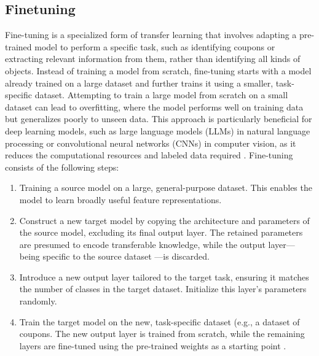 \documentclass[licencjacka,en]{pracamgr}
\begin{document}
\subsection{Finetuning}
Fine-tuning is a specialized form of transfer learning that involves adapting a pre-trained model to perform a specific task, such as identifying coupons or extracting relevant information from them, rather than identifying all kinds of objects. Instead of training a model from scratch, fine-tuning starts with a model already trained on a large dataset and further trains it using a smaller, task-specific dataset. Attempting to train a large model from scratch on a small dataset can lead to overfitting, where the model performs well on training data but generalizes poorly to unseen data. This approach is particularly beneficial for deep learning models, such as large language models (LLMs) in natural language processing or convolutional neural networks (CNNs) in computer vision, as it reduces the computational resources and labeled data required \cite{ibm_finetuning}.
Fine-tuning consists of the following steps:
\begin{enumerate}
	\item Training a source model on a large, general-purpose dataset. This enables the model to learn broadly useful feature representations.
	\item Construct a new target model by copying the architecture and parameters of the source model, excluding its final output layer. The retained parameters are presumed to encode transferable knowledge, while the output layer—being specific to the source dataset —is discarded.
	\item Introduce a new output layer tailored to the target task, ensuring it matches the number of classes in the target dataset. Initialize this layer’s parameters randomly.
	\item Train the target model on the new, task-specific dataset (e.g., a dataset of coupons. The new output layer is trained from scratch, while the remaining layers are fine-tuned using the pre-trained weights as a starting point \cite{finetune_cool_image}.
\end{enumerate}


\end{document}
